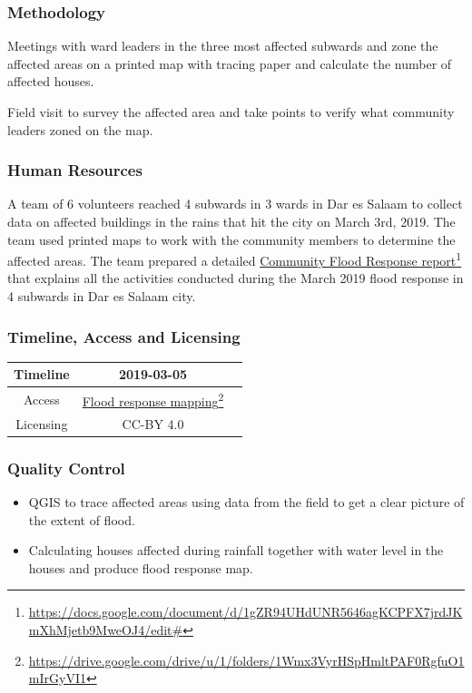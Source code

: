 \documentclass[a4paper,12pt,twoside]{article}
\begin{document}
\subsubsection{Methodology}
Meetings with ward leaders in the three most affected subwards and zone the affected areas on a printed map with tracing paper and calculate the number of affected houses.

Field visit to survey the affected area and take points to verify what community leaders zoned on the map.

\subsubsection{Human Resources}
A team of 6 volunteers reached 4 subwards in 3 wards in Dar es Salaam to collect data on affected buildings in the rains that hit the city on March 3rd, 2019. The team used printed maps to work with the community members to determine the affected areas. The team prepared a detailed \href{https://docs.google.com/document/d/1gZR94UHdUNR5646agKCPFX7jrdJKmXhMjetb9MweOJ4/edit#}{Community Flood Response report}\footnote{\url{https://docs.google.com/document/d/1gZR94UHdUNR5646agKCPFX7jrdJKmXhMjetb9MweOJ4/edit#}} that explains all the activities conducted during the March 2019 flood response in 4 subwards in Dar es Salaam city.

\subsubsection{Timeline, Access and Licensing}
\begin{center}
\begin{tabular}{|c|c|c|}  
 \hline
  Timeline  &  2019-03-05 \\
\hline  
 Access  & 
   \href{https://drive.google.com/drive/u/1/folders/1Wmx3VyrHSpHmltPAF0RgfuO1mIrGyVI1}{Flood response mapping}\footnote{\url{https://drive.google.com/drive/u/1/folders/1Wmx3VyrHSpHmltPAF0RgfuO1mIrGyVI1}} \\
  
\hline
Licensing   &  CC-BY 4.0 \\
\hline

\end{tabular}
\end{center}

\subsubsection{Quality Control}
\begin{itemize}
    \item QGIS to trace affected areas using data from the field to get a clear picture of the extent of flood. 
   \item Calculating houses affected during rainfall together with  water level in the houses  and produce flood response map.
\end{itemize}
\end{document}
